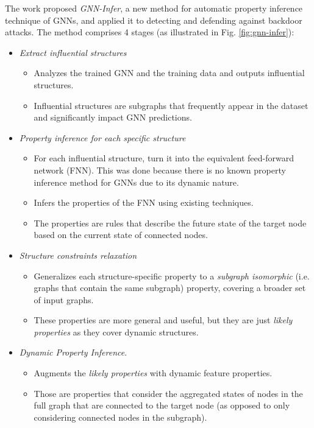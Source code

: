 \documentclass[english,report,10pt]{extarticle}
\begin{document}
The work proposed \textit{GNN-Infer}, a new method for automatic property inference technique of GNNs, and applied it to detecting and defending against backdoor attacks. The method comprises 4 stages (as illustrated in Fig. \ref{fig:gnn-infer}):
\begin{itemize}
    \item \textit{Extract influential structures}
          \begin{itemize}
              \item Analyzes the trained GNN and the training data and outputs influential structures.
              \item Influential structures are subgraphs that frequently appear in the dataset and significantly impact GNN predictions.
          \end{itemize}
    \item \textit{Property inference for each specific structure}
          \begin{itemize}
              \item For each influential structure, turn it into the equivalent feed-forward network (FNN). This was done because there is no known property inference method for GNNs due to its dynamic nature.
              \item Infers the properties of the FNN using existing techniques.
              \item The properties are rules that describe the future state of the target node based on the current state of connected nodes.
          \end{itemize}
    \item \textit{Structure constraints relaxation}
          \begin{itemize}
              \item Generalizes each structure-specific property to a \textit{subgraph isomorphic} (i.e. graphs that contain the same subgraph) property, covering a broader set of input graphs.
              \item These properties are more general and useful, but they are just \textit{likely properties} as they cover dynamic structures.
          \end{itemize}
    \item \textit{Dynamic Property Inference}.
          \begin{itemize}
              \item Augments the \textit{likely properties} with dynamic feature properties.
              \item Those are properties that consider the aggregated states of nodes in the full graph that are connected to the target node (as opposed to only considering connected nodes in the subgraph).
          \end{itemize}
\end{itemize}
\end{document}

